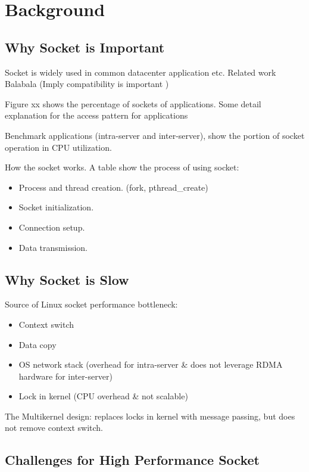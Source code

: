 \section{Background}
\label{sec:background}

\subsection{Why Socket is Important}

Socket is widely used in common datacenter application etc. Related work Balabala (Imply compatibility is important )

Figure xx shows the percentage of sockets of applications. Some detail explanation for the access pattern for applications

Benchmark applications (intra-server and inter-server), show the portion of socket operation in CPU utilization.

How the socket works. A table show the process of using socket:

\begin{itemize}
	\item Process and thread creation. (fork, pthread\_create)
	\item Socket initialization.
	\item Connection setup.
	\item Data transmission.
\end{itemize}


\subsection{Why Socket is Slow}
Source of Linux socket performance bottleneck:
\begin{itemize}
	\item Context switch
	\item Data copy
	\item OS network stack (overhead for intra-server \& does not leverage RDMA hardware for inter-server)
	\item Lock in kernel (CPU overhead \& not scalable)
\end{itemize}

The Multikernel design: replaces locks in kernel with message passing, but does not remove context switch.

\subsection{Challenges for High Performance Socket}

